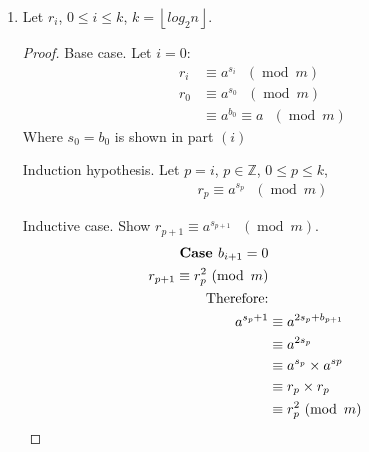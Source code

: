 \documentclass[11pt]{article}
\theoremstyle{definition}
\renewcommand{\pmod}[1]{\mbox{\ $(\ensuremath{\operatorname{mod}}\ {#1})$}}
\newcommand{\Z}{\mathbb{Z}}
\begin{document}
\begin{enumerate}
\begin{enumerate}
\begin{enumerate}
\begin{proof}
          Inductive case. Assume $i = m + 1$:
          \begin{align*}
            s_{m + 1} = \sum^{m + 1}_{j = 0} b_j 2^{(m + 1) - j} \\
            \text{Left hand side: } \\
            s_{m + 1} = 2s_m + b_{m + 1} \\
            \text{Right hand side: } \\
            \sum^{m + 1}_{j = 0} b_j 2^{(m + 1) - j} &= 2 \times \sum^{m}_{j = 0} b_j 2^{(m - j)} + b_{m + 1} \\
                                                     &= 2s_m + b_{m + 1} \\ \\
            \text{Therefore, } s_i &= \sum^{i}_{j = 0} b_j 2^{i - j}
          \end{align*}
        \end{proof}
      \item
        Let $r_i$, $0 \leq i \leq k$, $k = \left \lfloor{log_2{n}}\right \rfloor$.
        \begin{proof}
          Base case. Let $i = 0$:
          \begin{align*}
            r_i &\equiv a^{s_i} \pmod{m} \\
            r_0 &\equiv a^{s_0} \pmod{m} \\
                &\equiv a^{b_0} \equiv a \pmod{m}
          \end{align*}
          Where $s_0 = b_0$ is shown in part $(i)$

          Induction hypothesis. Let $p = i$, $p \in \Z$, $0 \leq p \leq k$,
          \begin{align*}
            r_p \equiv a^{s_p} \pmod{m}
          \end{align*}

          Inductive case. Show $r_{p + 1} \equiv a^{s_{p + 1}} \pmod{m}$.
          \begin{align*}
            \text{\textbf{Case }} b_{i + 1} = 0 \\
            r_{p + 1} \equiv r^2_p \pmod{m} \\
            \text{Therefore:} \\
            a^{s_p + 1} &\equiv a^{2s_p + b_{p + 1}} \\
                        &\equiv a^{2s_p} \\
                        &\equiv a^{s_p} \times a^{sp} \\
                        &\equiv r_{p} \times r_{p} \\
                        &\equiv r^2_{p} \pmod{m}
          \end{align*}


\end{proof}
\end{enumerate}
\end{enumerate}
\end{enumerate}
\end{document}
